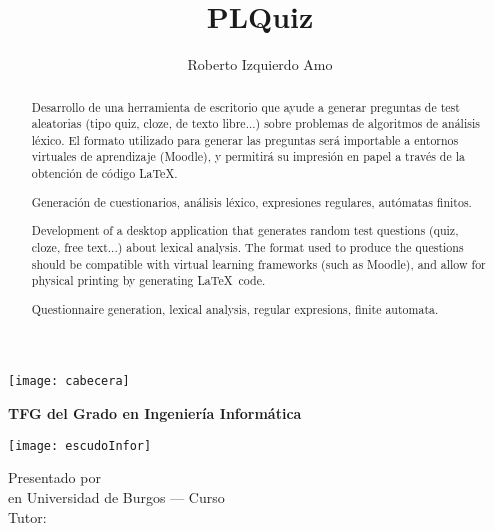 \documentclass[a4paper,11pt,oneside]{memoir}
\title{PLQuiz}
\author{Roberto Izquierdo Amo}
\date{}
\makeatletter
\def\maketitle{
  \null
  \thispagestyle{empty}
\noindent\texttt{[image: cabecera]}\vspace{1cm}%
  \vfill
  \colorbox{cpardoBox}{%
    \begin{minipage}{.8\textwidth}
      \vspace{.5cm}\Large
      \begin{center}
      \textbf{TFG del Grado en Ingeniería Informática}\vspace{.6cm}\\
      \textbf{\LARGE\@title{}}
      \end{center}
      \vspace{.2cm}
    \end{minipage}

  }%
  \hfill\begin{minipage}{.20\textwidth}
    \texttt{[image: escudoInfor]}
  \end{minipage}
  \vfill
  \begin{center}%
  {%
    \noindent\LARGE
    Presentado por \@author{}\\ 
    en Universidad de Burgos --- Curso \@course{}\\
    Tutor: \@tutor{}\\
  }%
  \end{center}%
  \null
  \cleardoublepage
  }
\makeatother
\begin{document}
\maketitle

\frontmatter

\renewcommand*\abstractname{Resumen}
\begin{abstract}
Desarrollo de una herramienta de escritorio que ayude a generar preguntas de test aleatorias (tipo quiz, cloze, de texto libre...) sobre problemas de algoritmos de análisis léxico.
El formato utilizado para generar las preguntas será importable a entornos virtuales de aprendizaje (Moodle), y permitirá su impresión en papel a través de la obtención de código \LaTeX .
\end{abstract}

\renewcommand*\abstractname{Descriptores}
\begin{abstract}
Generación de cuestionarios, análisis léxico, expresiones regulares, autómatas finitos.
\end{abstract}

\clearpage

\renewcommand*\abstractname{Abstract}
\begin{abstract}
Development of a desktop application that generates random test questions (quiz, cloze, free text...) about lexical analysis.
The format used to produce the questions should be compatible with virtual learning frameworks (such as Moodle), and allow for physical printing by generating \LaTeX\ code.
\end{abstract}

\renewcommand*\abstractname{Keywords}
\begin{abstract}
Questionnaire generation, lexical analysis, regular expresions, finite automata.
\end{abstract}

\clearpage

\tableofcontents

\clearpage

\listoffigures

\clearpage



\mainmatter








\appendix







\end{document}
